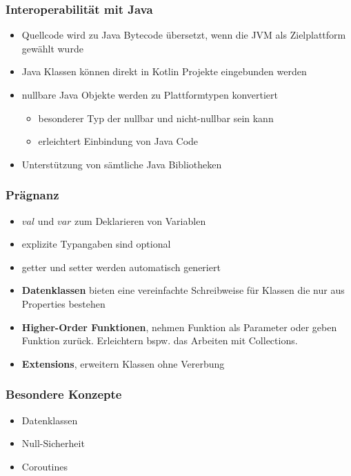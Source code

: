 \documentclass{beamer}
\begin{document}
\begin{frame}
\frametitle{Interoperabilität mit Java}
\begin{itemize}
\onehalfspacing
    \item Quellcode wird zu Java Bytecode übersetzt, wenn die JVM als Zielplattform gewählt wurde
    \item Java Klassen können direkt in Kotlin Projekte eingebunden werden
    \item nullbare Java Objekte werden zu Plattformtypen konvertiert
    \begin{itemize}
        \item besonderer Typ der nullbar und nicht-nullbar sein kann
        \item erleichtert Einbindung von Java Code
    \end{itemize}
    \item Unterstützung von sämtliche Java Bibliotheken
\end{itemize}
\end{frame}

\begin{frame}
\frametitle{Prägnanz}
\begin{itemize}
\onehalfspacing
    \item $val$ und $var$ zum Deklarieren von Variablen
    \item explizite Typangaben sind optional
    \item getter und setter werden automatisch generiert
    \item \textbf{Datenklassen} bieten eine vereinfachte Schreibweise für Klassen die nur aus Properties bestehen
    \item \textbf{Higher-Order Funktionen}, nehmen Funktion als Parameter oder geben Funktion zurück. Erleichtern bspw. das Arbeiten mit Collections.
    \item \textbf{Extensions}, erweitern Klassen ohne Vererbung
\end{itemize}
\end{frame}

\begin{frame}
\frametitle{Besondere Konzepte}
\begin{itemize}
\onehalfspacing
\item Datenklassen
\item Null-Sicherheit
\item Coroutines
\end{itemize}
\end{frame}
\end{document}
